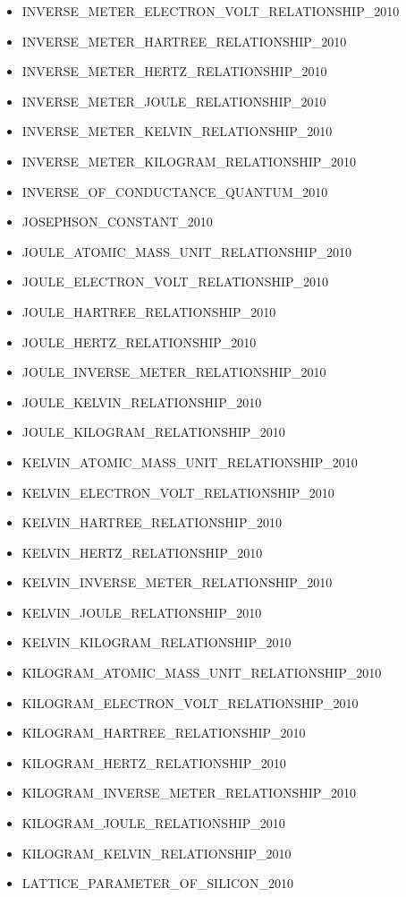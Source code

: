 \begin{itemize}
\item
  INVERSE\_METER\_ELECTRON\_VOLT\_RELATIONSHIP\_2010
\item
  INVERSE\_METER\_HARTREE\_RELATIONSHIP\_2010
\item
  INVERSE\_METER\_HERTZ\_RELATIONSHIP\_2010
\item
  INVERSE\_METER\_JOULE\_RELATIONSHIP\_2010
\item
  INVERSE\_METER\_KELVIN\_RELATIONSHIP\_2010
\item
  INVERSE\_METER\_KILOGRAM\_RELATIONSHIP\_2010
\item
  INVERSE\_OF\_CONDUCTANCE\_QUANTUM\_2010
\item
  JOSEPHSON\_CONSTANT\_2010
\item
  JOULE\_ATOMIC\_MASS\_UNIT\_RELATIONSHIP\_2010
\item
  JOULE\_ELECTRON\_VOLT\_RELATIONSHIP\_2010
\item
  JOULE\_HARTREE\_RELATIONSHIP\_2010
\item
  JOULE\_HERTZ\_RELATIONSHIP\_2010
\item
  JOULE\_INVERSE\_METER\_RELATIONSHIP\_2010
\item
  JOULE\_KELVIN\_RELATIONSHIP\_2010
\item
  JOULE\_KILOGRAM\_RELATIONSHIP\_2010
\item
  KELVIN\_ATOMIC\_MASS\_UNIT\_RELATIONSHIP\_2010
\item
  KELVIN\_ELECTRON\_VOLT\_RELATIONSHIP\_2010
\item
  KELVIN\_HARTREE\_RELATIONSHIP\_2010
\item
  KELVIN\_HERTZ\_RELATIONSHIP\_2010
\item
  KELVIN\_INVERSE\_METER\_RELATIONSHIP\_2010
\item
  KELVIN\_JOULE\_RELATIONSHIP\_2010
\item
  KELVIN\_KILOGRAM\_RELATIONSHIP\_2010
\item
  KILOGRAM\_ATOMIC\_MASS\_UNIT\_RELATIONSHIP\_2010
\item
  KILOGRAM\_ELECTRON\_VOLT\_RELATIONSHIP\_2010
\item
  KILOGRAM\_HARTREE\_RELATIONSHIP\_2010
\item
  KILOGRAM\_HERTZ\_RELATIONSHIP\_2010
\item
  KILOGRAM\_INVERSE\_METER\_RELATIONSHIP\_2010
\item
  KILOGRAM\_JOULE\_RELATIONSHIP\_2010
\item
  KILOGRAM\_KELVIN\_RELATIONSHIP\_2010
\item
  LATTICE\_PARAMETER\_OF\_SILICON\_2010

\end{itemize}
